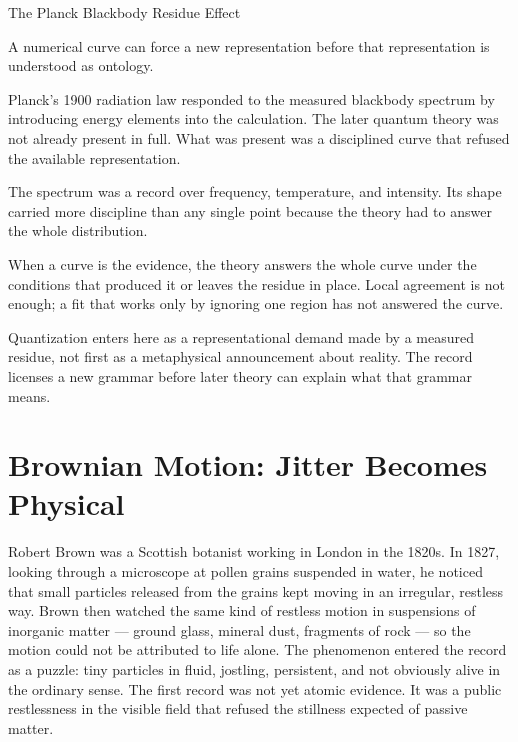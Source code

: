 \begin{phenom}{The Planck Blackbody Residue Effect~\cite{planck1900}}
\label{ph:planck-blackbody-residue}

\PhStatement
A numerical curve can force a new representation before that representation is
understood as ontology.

\PhOrigin
Planck's 1900 radiation law responded to the measured blackbody spectrum by
introducing energy elements into the calculation. The later quantum theory was
not already present in full. What was present was a disciplined curve that
refused the available representation.

\PhObservation
The spectrum was a record over frequency, temperature, and intensity. Its
shape carried more discipline than any single point because the theory had to
answer the whole distribution.

\PhConstraint
When a curve is the evidence, the theory answers the whole curve under the
conditions that produced it or leaves the residue in place. Local agreement
is not enough; a fit that works only by ignoring one region has not
answered the curve.

\PhConsequence
Quantization enters here as a representational demand made by a measured
residue, not first as a metaphysical announcement about reality. The record
licenses a new grammar before later theory can explain what that grammar
means.
\end{phenom}

\section{Brownian Motion: Jitter Becomes Physical}

Robert Brown was a Scottish botanist working in London in the 1820s. In
1827, looking through a microscope at pollen grains suspended in water, he
noticed that small particles released from the grains kept moving in an
irregular, restless way. Brown then watched the same kind of restless
motion in suspensions of inorganic matter --- ground glass, mineral
dust, fragments of rock --- so the motion could not be attributed to life
alone. The phenomenon entered the record as a puzzle: tiny particles in
fluid, jostling, persistent, and not obviously alive in the ordinary
sense. The first record was not yet atomic evidence. It was a public
restlessness in the visible field that refused the stillness expected of
passive matter.

